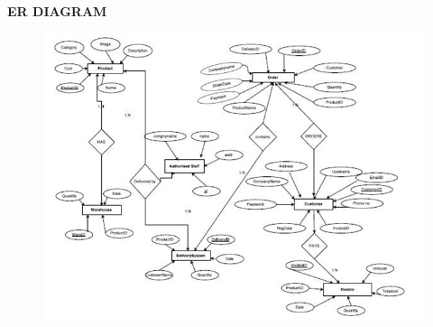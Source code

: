 \documentclass{tcc}
\begin{document}
\begin{center}
\textbf{\Large{ER DIAGRAM}}
\end{center}
\begin{figure}[H]
\centering
\includegraphics{images/er.PNG}\\
\end{figure}
\end{document}
